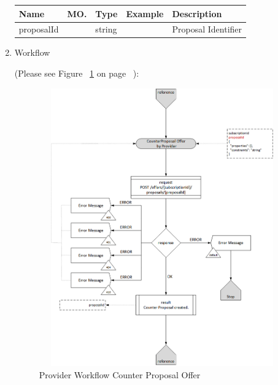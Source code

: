 \begin{enumerate}
\begin{table}[H]
\footnotesize

\begin{center}
\begin{tabular}{|p{3cm}|l|p{3cm}|p{3cm}|p{4cm}|} 
\hline
\rowcolor{lightgray}	Name	& MO.	& Type	& Example & 	Description \\
\hline

proposalId	&	&	string				&								& Proposal Identifier \\
\hline

\end{tabular}
\end{center}

\end{table}

\item Workflow

(Please see Figure ~\ref{fig:CPO} on page ~\pageref{fig:CPO}):

\begin{figure}[H]
    \centering
    \includegraphics[width=12cm,height=12cm,angle=0]{./diag/Workflow/Market/CounterProposalOffer-P-Workflow.png}
    \caption{Provider Workflow Counter Proposal Offer }
	\label{fig:CPO}
\end{figure}

\end{enumerate}

\newpage


